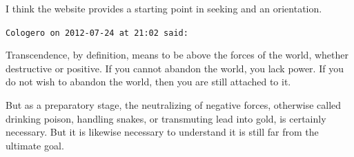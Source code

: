 \begin{footnotesize}
\begin{sffamily}
I think the website provides a starting point in seeking and an orientation.


\hfill

\texttt{Cologero on 2012-07-24 at 21:02 said: }

Transcendence, by definition, means to be above the forces of the world, whether destructive or positive. If you cannot abandon the world, you lack power. If you do not wish to abandon the world, then you are still attached to it.

But as a preparatory stage, the neutralizing of negative forces, otherwise called drinking poison, handling snakes, or transmuting lead into gold, is certainly necessary. But it is likewise necessary to understand it is still far from the ultimate goal.


\end{sffamily}\end{footnotesize}
